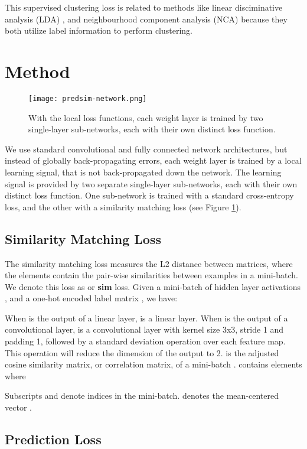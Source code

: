 \documentclass{article}
\begin{document}
This supervised clustering loss is related to methods like linear disciminative analysis (LDA) \cite{Fisher36}, and neighbourhood component analysis (NCA) \cite{GoldbergerHSS05} because they both utilize label information to perform clustering.

\section{Method}

\begin{figure}[h]
  \texttt{[image: predsim-network.png]}
  \caption{With the local loss functions, each weight layer is trained by two single-layer sub-networks, each with their own distinct loss function.}
  \label{fig:predsimnet}
\end{figure}

We use standard convolutional and fully connected network architectures, but instead of globally back-propagating errors, each weight layer is trained by a local learning signal, that is not back-propagated down the network. The learning signal is provided by two separate single-layer sub-networks, each with their own distinct loss function. One sub-network is trained with a standard cross-entropy loss, and the other with a similarity matching loss (see Figure \ref{fig:predsimnet}).

\subsection{Similarity Matching Loss}
 
The similarity matching loss measures the L2 distance between matrices, where the elements contain the pair-wise similarities between examples in a mini-batch. We denote this loss as  or \textbf{sim} loss. Given a mini-batch of hidden layer activations , and a one-hot encoded label matrix , we have:

When  is the output of a linear layer,  is a linear layer. When  is the output of a convolutional layer,  is a convolutional layer with kernel size 3x3, stride 1 and padding 1, followed by a standard deviation operation over each feature map. This operation will reduce the dimension of the output to 2.  is the adjusted cosine similarity matrix, or correlation matrix, of a mini-batch .  contains elements  where 

Subscripts  and  denote indices in the mini-batch.  denotes the mean-centered vector .

\subsection{Prediction Loss}
\end{document}
